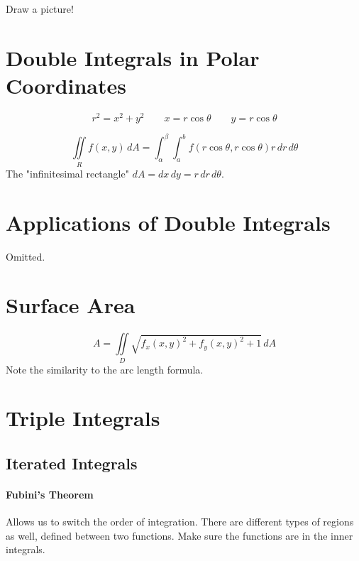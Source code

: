 \documentclass{report}  %
\begin{document}
Draw a picture!

\section{Double Integrals in Polar Coordinates}
\begin{equation}
	r^2 = x^2 + y^2 \qquad x = r \cos{\theta} \qquad y = r \cos{\theta}
\end{equation}

\begin{equation}
	\iint \limits_R f(x,y) \, dA = 
	\int_\alpha^\beta \int_a^b f(r \cos{\theta}, r \cos{\theta}) r \, dr \, d\theta
\end{equation}
The "infinitesimal rectangle" $dA = dx \, dy = r \, dr \, d\theta$.

\section{Applications of Double Integrals}
Omitted. 

\section{Surface Area}
\begin{equation}
	A = \iint \limits_D \sqrt{f_x(x,y)^2 + f_y(x,y)^2 + 1} \, dA 
\end{equation}
Note the similarity to the arc length formula.

\section{Triple Integrals}
\subsection*{Iterated Integrals}
\paragraph{Fubini's Theorem} Allows us to switch the order of integration. 
There are different types of regions as well, defined between two functions. 
Make sure the functions are in the inner integrals.
\end{document}

